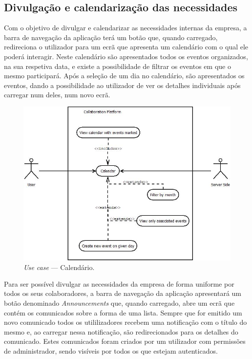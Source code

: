 \subsection{Divulgação e calendarização das necessidades}

Com o objetivo de divulgar e calendarizar as necessidades internas da empresa, a barra de navegação da aplicação terá um botão que, quando carregado, 
redireciona o utilizador para um ecrã que apresenta um calendário com o qual ele poderá interagir. 
Neste calendário são apresentados todos os eventos organizados, na sua respetiva data, e existe a possibilidade de filtrar os eventos em que o mesmo participará. 
Após a seleção de um dia no calendário, são apresentados os eventos, dando a possibilidade ao utilizador de ver os detalhes individuais após carregar num deles, 
num novo ecrã.

\begin{figure}[H]
    \centering
    \includegraphics[scale=0.6]{figures/Calendar use case.jpeg}
    \caption{\textit{Use case} --- Calendário.}\label{fig:uc:calendar}
\end{figure}

Para ser possível divulgar as necessidades da empresa de forma uniforme por todos os seus colaboradores, a barra de navegação da aplicação apresentará 
um botão denominado \textit{Announcements} que, quando carregado, abre um ecrã que contém os comunicados sobre a forma de uma lista. 
Sempre que for emitido um novo comunicado todos os utililizadores recebem uma notificação com o título do mesmo e, ao carregar nessa notificação, são redirecionados para os detalhes do comunicado. 
Estes comunicados foram criados por um utilizador com permissões de administrador, sendo visíveis por todos os que estejam autenticados.

